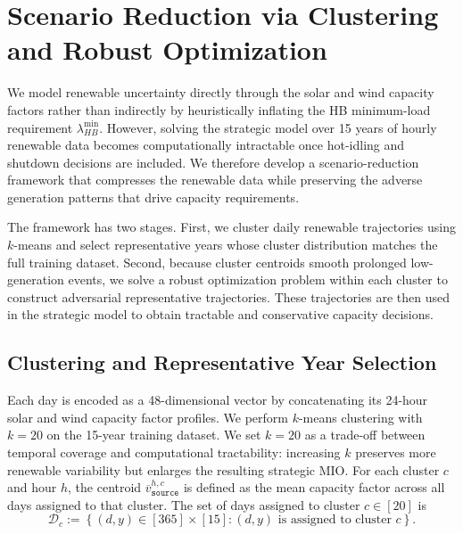 \documentclass[11pt, letter]{article}
\begin{document}
\section{Scenario Reduction via Clustering and Robust Optimization}
\label{section:scenario-reduction}

We model renewable uncertainty directly through the solar and wind capacity factors rather than indirectly by heuristically inflating the HB minimum-load requirement $\lambda_{HB}^{\min}$. However, solving the strategic model over 15 years of hourly renewable data becomes computationally intractable once hot-idling and shutdown decisions are included. We therefore develop a scenario-reduction framework that compresses the renewable data while preserving the adverse generation patterns that drive capacity requirements.

The framework has two stages. First, we cluster daily renewable trajectories using $k$-means and select representative years whose cluster distribution matches the full training dataset. Second, because cluster centroids smooth prolonged low-generation events, we solve a robust optimization problem within each cluster to construct adversarial representative trajectories. These trajectories are then used in the strategic model to obtain tractable and conservative capacity decisions.

\subsection{Clustering and Representative Year Selection}

Each day is encoded as a 48-dimensional vector by concatenating its 24-hour solar and wind capacity factor profiles. We perform $k$-means clustering with $k = 20$ on the 15-year training dataset. We set $k=20$ as a trade-off between temporal coverage and computational tractability: increasing $k$ preserves more renewable variability but enlarges the resulting strategic MIO. For each cluster $c$ and hour $h$, the centroid $\overline{v}^{h,c}_{\texttt{source}}$ is defined as the mean capacity factor across all days assigned to that cluster. The set of days assigned to cluster $c \in [20]$ is
\[
\mathcal{D}_c := \left\{(d,y) \in [365] \times [15] : (d,y) \text{ is assigned to cluster } c \right\}.
\]
\end{document}
